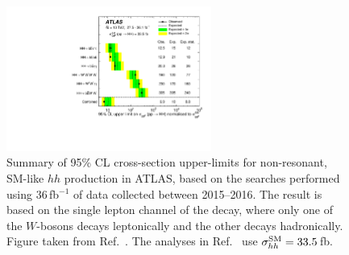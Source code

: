 \begin{figure}[!htb]
    \begin{center}
        \includegraphics[width=0.6\textwidth]{figures/search_hh/hh_intro/hh_comb_36}
        \caption{
            Summary of 95\% CL cross-section upper-limits for non-resonant, SM-like $hh$
            production in ATLAS, based on the searches performed using 36\,fb$^{-1}$ of
            data collected between 2015--2016.
            The \bbww result is based on the single lepton channel of the \bbww decay,
            where only one of the $W$-bosons decays leptonically and the other decays hadronically.
            Figure taken from Ref.~\cite{HHComb36}.
            The analyses in Ref.~\cite{HHComb36} use $\sigma_{hh}^{\text{SM}} = 33.5$\,fb.
        }
        \label{fig:hh_comb_36}
    \end{center}
\end{figure}

%
%
\FloatBarrier

\FloatBarrier




